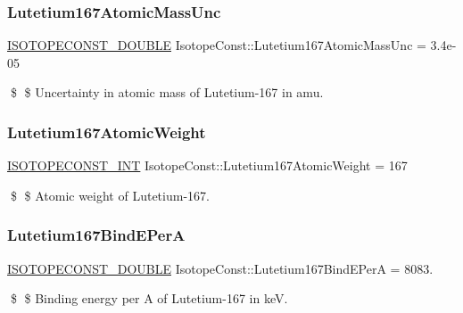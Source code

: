 \subsubsection{\texorpdfstring{Lutetium167\+Atomic\+Mass\+Unc}{Lutetium167AtomicMassUnc}}
{\footnotesize\ttfamily \mbox{\hyperlink{group___isotope_const-_macros_ga8f45a7272ce02c0b4c65c44636ed719a}{I\+S\+O\+T\+O\+P\+E\+C\+O\+N\+S\+T\+\_\+\+D\+O\+U\+B\+LE}} Isotope\+Const\+::\+Lutetium167\+Atomic\+Mass\+Unc = 3.\+4e-\/05}

\$ \$ Uncertainty in atomic mass of Lutetium-\/167 in amu. \mbox{\label{group___isotope_const-_lutetium-_lu167_gadc09ea17e961cd4f91ee1577e24a39ed}} 
\subsubsection{\texorpdfstring{Lutetium167\+Atomic\+Weight}{Lutetium167AtomicWeight}}
{\footnotesize\ttfamily \mbox{\hyperlink{group___isotope_const-_macros_ga5f18360b3e99483a35c32d789e62621c}{I\+S\+O\+T\+O\+P\+E\+C\+O\+N\+S\+T\+\_\+\+I\+NT}} Isotope\+Const\+::\+Lutetium167\+Atomic\+Weight = 167}

\$ \$ Atomic weight of Lutetium-\/167. \mbox{\label{group___isotope_const-_lutetium-_lu167_gaec570eeb67439dc0d04352040efe836f}} 
\subsubsection{\texorpdfstring{Lutetium167\+Bind\+E\+PerA}{Lutetium167BindEPerA}}
{\footnotesize\ttfamily \mbox{\hyperlink{group___isotope_const-_macros_ga8f45a7272ce02c0b4c65c44636ed719a}{I\+S\+O\+T\+O\+P\+E\+C\+O\+N\+S\+T\+\_\+\+D\+O\+U\+B\+LE}} Isotope\+Const\+::\+Lutetium167\+Bind\+E\+PerA = 8083.}

\$ \$ Binding energy per A of Lutetium-\/167 in keV. \mbox{\label{group___isotope_const-_lutetium-_lu167_gaba2109d962c70cbddd8c43d7a1da5195}} 
